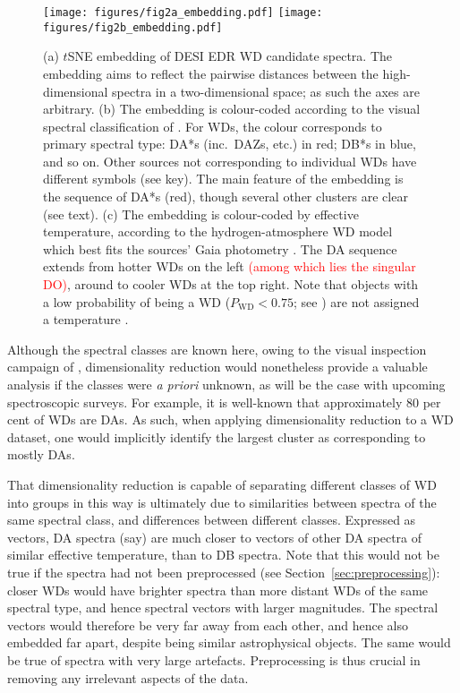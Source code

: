 \documentclass[fleqn,usenatbib]{mnras}
\newcommand{\red}[1]{\textcolor{red}{#1}}
\begin{document}
\begin{figure*}
    \centering
\texttt{[image: figures/fig2a\_embedding.pdf]}
\texttt{[image: figures/fig2b\_embedding.pdf]}
\caption{
    (a) $t$SNE embedding of DESI EDR WD candidate spectra.
    The embedding aims to reflect the pairwise distances between the high-dimensional spectra in a two-dimensional space; as such the axes are arbitrary.
    (b) The embedding is colour-coded according to the visual spectral classification of \citet{manser24}.
    For WDs, the colour corresponds to primary spectral type: DA*s (inc.\ DAZs, etc.) in red; DB*s in blue, and so on.
    Other sources not corresponding to individual WDs have different symbols (see key).
    The main feature of the embedding is the sequence of DA*s (red), though several other clusters are clear (see text).
    (c) The embedding is colour-coded by effective temperature, according to the hydrogen-atmosphere WD model which best fits the sources' Gaia photometry \citep{gentilefusillo19}.
    The DA sequence extends from hotter WDs on the left \red{(among which lies the singular DO)}, around to cooler WDs at the top right.
    Note that objects with a low probability of being a WD ($P_\mathrm{WD} < 0.75$; see \citealt{gentilefusillo15}) are not assigned a temperature \citep{gentilefusillo19}.
}
\label{fig:full_spectra}
\end{figure*}

Although the spectral classes are known here, owing to the visual inspection campaign of \citet{manser24}, dimensionality reduction would nonetheless provide a valuable analysis if the classes were \textit{a priori} unknown, as will be the case with upcoming spectroscopic surveys.
For example, it is well-known that approximately 80 per cent of WDs are DAs.
As such, when applying dimensionality reduction to a WD dataset, one would implicitly identify the largest cluster as corresponding to mostly DAs.

That dimensionality reduction is capable of separating different classes of WD into groups in this way is ultimately due to similarities between spectra of the same spectral class, and differences between different classes.
Expressed as vectors, DA spectra (say) are much closer to vectors of other DA spectra of similar effective temperature, than to DB spectra.
Note that this would not be true if the spectra had not been preprocessed (see Section~\ref{sec:preprocessing}): closer WDs would have brighter spectra than more distant WDs of the same spectral type, and hence spectral vectors with larger magnitudes.
The spectral vectors would therefore be very far away from each other, and hence also embedded far apart, despite being similar astrophysical objects.
The same would be true of spectra with very large artefacts.
Preprocessing is thus crucial in removing any irrelevant aspects of the data.
\end{document}
